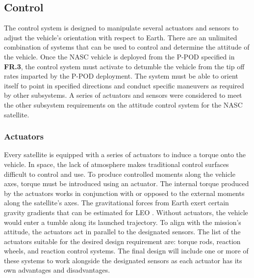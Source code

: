 
\subsection{Control}
 The control system is designed to manipulate several actuators and sensors to adjust the vehicle's orientation with respect to Earth. There are an unlimited combination of systems that can be used to control and determine the attitude of the vehicle. Once the NASC vehicle is deployed from the P-POD specified in \textbf{FR.3}, the control system must activate to detumble the vehicle from the tip off rates imparted by the P-POD deployment. The system must be able to orient itself to point in specified directions and conduct specific maneuvers as required by other subsystems. A series of actuators and sensors were considered to meet the other subsystem requirements on the attitude control system for the NASC satellite.
\subsubsection{Actuators}
Every satellite is equipped with a series of actuators to induce a torque onto the vehicle. In space, the lack of atmosphere makes traditional control surfaces difficult to control and use. To produce controlled moments along the vehicle axes, torque must be introduced using an actuator. The internal torque produced by the actuators works in conjunction with or opposed to the external moments along the satellite's axes. The gravitational forces from Earth exert certain gravity gradients that can be estimated for LEO \cite{AttSim}. Without actuators, the vehicle would enter a tumble along its launched trajectory. To align with the mission's attitude, the actuators act in parallel to the designated sensors. The list of the actuators suitable for the desired design requirement are: torque rods, reaction wheels, and reaction control systems. The final design will include one or more of these systems to work alongside the designated sensors as each actuator has its own advantages and disadvantages. 
%
